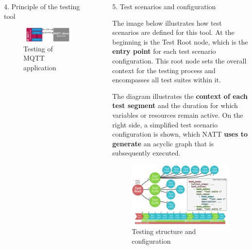 \documentclass[final]{beamer}
\newlength{\sepwidth}
\newlength{\colwidth}
\newcommand{\separatorcolumn}{\begin{column}{\sepwidth}\end{column}}
\begin{document}
\begin{frame}[t]
\begin{columns}[t]
\begin{column}{\colwidth}
\begin{block}{4. Principle of the testing tool}
    \begin{figure}
      \centering
        \includegraphics[width=1.0\textwidth]{./imgs/mqtt-diagram.png}
      \caption{Testing of MQTT application}
    \end{figure}

  \end{block}

\end{column}

\separatorcolumn

\begin{column}{\colwidth}

  \begin{block}{5. Test scenarios and configuration}

    The image below illustrates how test scenarios are defined for this tool. At the 
    beginning is the Test Root node, which is the \textbf{entry point} for each test 
    scenario configuration. This root node sets the overall context for the testing 
    process and encompasses all test suites within it. 

    \hspace{2em} The diagram illustrates the \textbf{context of each test segment} and the 
    duration for which variables or resources remain active. On the right side, a simplified
    test scenario configuration is shown, which NATT \textbf{uses to generate} an acyclic graph that 
    is subsequently executed.

    \begin{figure}
      \centering
        \includegraphics[width=1.0\textwidth]{./imgs/test-scructure.png}
      \caption{Testing structure and configuration}
    \end{figure}


\end{block}
\end{column}
\end{columns}
\end{frame}
\end{document}
